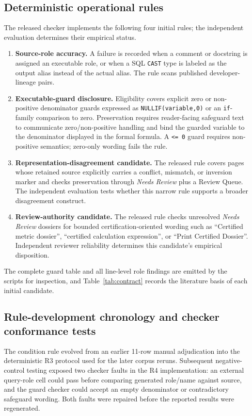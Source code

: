 \documentclass[a4paper,fleqn]{cas-dc}
\begin{document}
\subsection{Deterministic operational rules}
The released checker implements the following four initial rules; the independent evaluation determines their empirical status.
\begin{enumerate}[leftmargin=*]
\item \textbf{Source-role accuracy.} A failure is recorded when a comment or docstring is assigned an executable role, or when a SQL \texttt{CAST} type is labeled as the output alias instead of the actual alias. The rule scans published developer-lineage pairs.
\item \textbf{Executable-guard disclosure.} Eligibility covers explicit zero or non-positive denominator guards expressed as \texttt{NULLIF(variable,0)} or an \texttt{if}-family comparison to zero. Preservation requires reader-facing safeguard text to communicate zero/non-positive handling and bind the guarded variable to the denominator displayed in the formal formula. A \texttt{<= 0} guard requires non-positive semantics; zero-only wording fails the rule.
\item \textbf{Representation-disagreement candidate.} The released rule covers pages whose retained source explicitly carries a conflict, mismatch, or inversion marker and checks preservation through \emph{Needs Review} plus a Review Queue. The independent evaluation tests whether this narrow rule supports a broader disagreement construct.
\item \textbf{Review-authority candidate.} The released rule checks unresolved \emph{Needs Review} dossiers for bounded certification-oriented wording such as ``Certified metric dossier'', ``certified calculation expression'', or ``Print Certified Dossier''. Independent reviewer reliability determines this candidate's empirical disposition.
\end{enumerate}
The complete guard table and all line-level role findings are emitted by the scripts for inspection, and Table~\ref{tab:contract} records the literature basis of each initial candidate.

\subsection{Rule-development chronology and checker conformance tests}
The condition rule evolved from an earlier 11-row manual adjudication into the deterministic R3 protocol used for the later corpus reruns. Subsequent negative-control testing exposed two checker faults in the R4 implementation: an external query-role cell could pass before comparing generated role/name against source, and the guard checker could accept an empty denominator or contradictory safeguard wording. Both faults were repaired before the reported results were regenerated.
\end{document}
